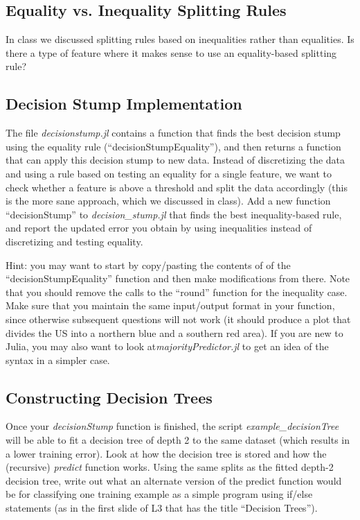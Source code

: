 \documentclass{article}
\def\blu#1{{\color{blu}#1}}
\begin{document}
\subsection{Equality vs. Inequality Splitting Rules}

In class we discussed splitting rules based on inequalities rather than equalities. \blu{Is there a type of feature where it makes sense to use 
an equality-based splitting rule?}




\subsection{Decision Stump Implementation}

The file \emph{decisionstump.jl} contains a function  that finds the best decision stump using the equality rule (``decisionStumpEquality''), and then returns a function that can apply this decision stump to new data. Instead of discretizing the data and using a rule based on testing an equality for a single feature, we want to check whether a feature is above a threshold and split the data accordingly (this is the more sane approach, which we discussed in class). \blu{Add a new function ``decisionStump'' to \emph{decision\_stump.jl} that finds the best inequality-based rule, and report the updated error you obtain by using inequalities instead of discretizing and testing equality.}

Hint: you may want to start by copy/pasting the contents of of the ``decisionStumpEquality'' function and then make modifications from there. Note that you should remove the calls to the ``round'' function for the inequality case.  Make sure that you maintain the same input/output format in your function, since otherwise subsequent questions will not work (it should produce a plot that divides the US into a northern blue and a southern red area).
If you are new to Julia, you may also want to look at\emph{majorityPredictor.jl} to get an idea of the syntax in  a simpler case.

\subsection{Constructing Decision Trees}

Once your \emph{decisionStump} function is finished, the script \emph{example\_decisionTree} will be able to fit a decision tree of depth 2 to the same dataset (which results in a lower training error). Look at how the decision tree is stored and how the (recursive) \emph{predict} function works. \blu{Using the same splits as the fitted depth-2 decision tree, write out what an alternate version of the predict function would be for classifying one training example as a simple program using if/else statements (as in the first slide of L3 that has the title ``Decision Trees'').}
\end{document}
